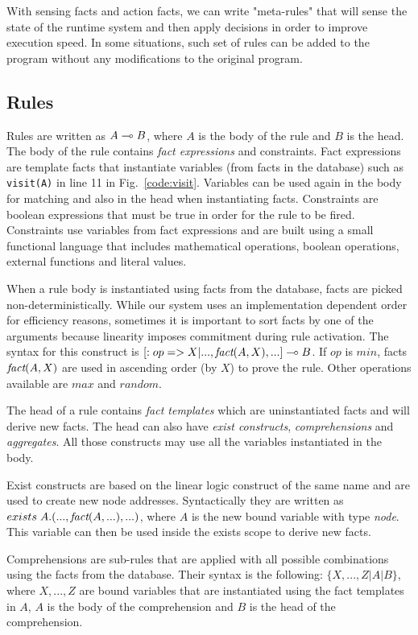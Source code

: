 With sensing facts and action facts, we can write "meta-rules" that will sense the state of the runtime system
and then apply decisions in order to improve execution speed. In some situations, such set of rules can be
added to the program without any modifications to the original program.

\subsection{Rules}

Rules are written as $A \multimap B$, where $A$ is the body of the rule and $B$ is the head.
The body of the rule contains \emph{fact expressions} and constraints.
Fact expressions are template facts that instantiate variables (from facts in the database)
such as \texttt{visit(A)} in line 11 in Fig.~\ref{code:visit}. Variables can be used again in the body for matching and
also in the head when instantiating facts. Constraints are boolean expressions that must
be true in order for the rule to be fired. Constraints use variables from fact expressions and are built using a small functional language that includes mathematical operations, boolean operations, external functions and literal values.

When a rule body is instantiated using facts from the database, facts are picked non-deterministically.
While our system uses an implementation dependent order for efficiency reasons,
sometimes it is important to sort facts by one of the arguments because linearity imposes commitment during rule activation. The syntax for this construct is $[:op => X | ..., \emph{fact}(A, X), ...] \multimap B$. If $op$ is $min$, facts $\emph{fact}(A, X)$ are used in ascending order (by $X$) to prove the rule. Other operations available are $max$ and $random$.

The head of a rule contains \emph{fact templates} which are uninstantiated facts and will derive new facts. The head can also have \emph{exist constructs}, \emph{comprehensions} and \emph{aggregates}. All those constructs may use all the variables instantiated in the body.

Exist constructs are based on the linear logic construct of the same name and are used to create new node addresses. Syntactically they are written as $exists \; A. (..., \emph{fact}(A, ...), ...)$, where $A$ is the new bound variable with type \emph{node}. This variable can then be used inside the exists scope to derive new facts.

Comprehensions are sub-rules that are applied with all possible combinations using the facts from the database. Their syntax is the following: $\{X, ..., Z | A | B\}$, where $X, ..., Z$ are bound variables that are instantiated using the fact templates in $A$, $A$ is the body of the comprehension and $B$ is the head of the comprehension.

